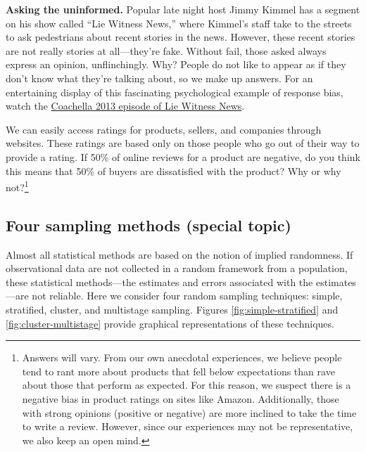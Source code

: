 \documentclass[
  10pt,
  openany]{book}
\theoremstyle{definition}
\theoremstyle{definition}
\theoremstyle{definition}
\theoremstyle{definition}
\theoremstyle{remark}
\begin{document}
\textbf{Asking the uninformed.} Popular late night host Jimmy Kimmel has a segment on his show called ``Lie Witness News,'' where Kimmel's staff take to the streets to ask pedestrians about recent stories in the news. However, these recent stories are not really stories at all---they're fake. Without fail, those asked always express an opinion, unflinchingly. Why? People do not like to appear as if they don't know what they're talking about, so we make up answers. For an entertaining display of this fascinating psychological example of response bias, watch the \href{https://www.youtube.com/watch?v=W_IzYUJANfk}{Coachella 2013 episode of Lie Witness News}.

We can easily access ratings for products, sellers, and companies through websites. These ratings are based only on those people who go out of their way to provide a rating. If 50\% of online reviews for a product are negative, do you think this means that 50\% of buyers are dissatisfied with the product? Why or why not?\footnote{Answers will vary. From our own anecdotal experiences, we believe people tend to rant more about products that fell below expectations than rave about those that perform as expected. For this reason, we suspect there is a negative bias in product ratings on sites like Amazon. Additionally, those with strong opinions (positive or negative) are more inclined to take the time to write a review. However, since our experiences may not be representative, we also keep an open mind.}


\subsection{Four sampling methods (special topic)}\label{samp-methods}

Almost all statistical methods are based on the notion of implied randomness.
If observational data are not collected in a random framework from a population, these statistical methods---the estimates and errors associated with the estimates---are not reliable.
Here we consider four random sampling techniques: simple, stratified, cluster, and multistage sampling. Figures \ref{fig:simple-stratified} and \ref{fig:cluster-multistage} provide graphical representations of these techniques.

\end{document}
